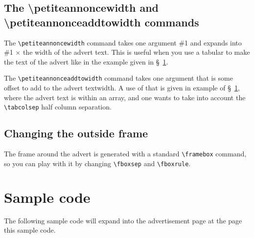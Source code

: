 \documentclass{article}
\begin{document}
\subsection{The \textbackslash petiteannoncewidth and \textbackslash petiteannonceaddtowidth commands}

The \verb!\petiteannoncewidth! command takes one argument \#1 and expands into \#1 \(\times\) the width of the
advert text. This is useful when you use a tabular to make the text of the advert like in the example given in
\S~\ref{sec:sample-code}.

The \verb!\petiteannonceaddtowidth! command takes one argument that is some offset to add to the advert
textwidth. A use of that is given in example of \S~\ref{sec:sample-code}, where the advert text is within an
array, and one wants to take into account the \verb!\tabcolsep! half column separation.

\subsection{Changing the outside frame}

The frame around the advert is generated with a standard \verb!\framebox! command, so you can play with it by
changing \verb!\fboxsep! and \verb!\fboxrule!.

\section{Sample code}
\label{sec:sample-code}

The following sample code will expand into the advertisement page at the page
this sample code.






\end{document}
